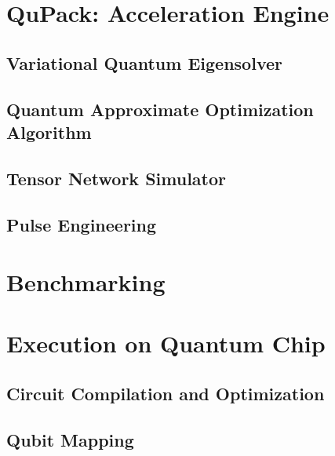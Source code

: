 \documentclass[pra,twocolumn,superscriptaddress,floatfix,nofootinbib,amsmath,amssymb]{revtex4-1}
\numberwithin{equation}{section}
\numberwithin{figure}{section}
\numberwithin{table}{section}
\begin{document}



\section{QuPack: Acceleration Engine}
\label{sec:qupack}


\subsection{Variational Quantum Eigensolver}


\subsection{Quantum Approximate Optimization Algorithm}


\subsection{Tensor Network Simulator}


\subsection{Pulse Engineering}



\section{Benchmarking}
\label{sec:benchmark}



\section{Execution on Quantum Chip}
\label{sec:chip}
\subsection{Circuit Compilation and Optimization}


\subsection{Qubit Mapping}


% 
\end{document}
